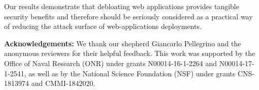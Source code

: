Our results demonstrate that debloating web applications
provides tangible security benefits and therefore should be seriously
considered as a practical way of reducing the attack surface of
web-applications deployments.

\vspace{0.5ex}
\noindent \textbf{Acknowledgements:} We thank our shepherd Giancarlo Pellegrino
and the anonymous reviewers for their helpful feedback.  This work was
supported by the Office of Naval Research (ONR) under grants N00014-16-1-2264
and N00014-17-1-2541, as well as by the National Science Foundation (NSF)
under grants CNS-1813974 and CMMI-1842020.

